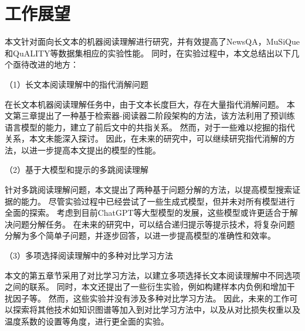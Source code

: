 \section{工作展望}
本文针对面向长文本的机器阅读理解进行研究，并有效提高了NewsQA，MuSiQue和QuALITY等数据集相应的实验性能。
同时，在实验过程中，本文总结出以下几个亟待改进的地方：

（1）长文本阅读理解中的指代消解问题

在长文本机器阅读理解任务中，由于文本长度巨大，存在大量指代消解问题。
本文第三章提出了一种基于检索器-阅读器二阶段架构的方法，该方法利用了预训练语言模型的能力，建立了前后文中的共指关系。
然而，对于一些难以挖掘的指代关系，本文未能深入探讨。
因此，在未来的研究中，可以继续研究指代消解的方法，以进一步提高本文提出的模型的性能。

（2）基于大模型和提示的多跳阅读理解

针对多跳阅读理解问题，本文提出了两种基于问题分解的方法，以提高模型搜索证据的能力。
尽管实验过程中已经尝试了一些生成式模型，但并未对所有模型进行全面的探索。
考虑到目前ChatGPT等大型模型的发展，这些模型或许更适合于解决问题分解任务。
在未来的研究中，可以结合递归提示等提示技术，将复杂问题分解为多个简单子问题，并逐步回答，以进一步提高模型的准确性和效率。

（3）多项选择阅读理解中的多种对比学习方法

本文的第五章节采用了对比学习方法，以建立多项选择长文本阅读理解中不同选项之间的联系。
同时，本文还提出了一些衍生实验，例如构建样本内负例和增加干扰因子等。
然而，这些实验并没有涉及多种对比学习方法。
因此，未来的工作可以探索将其他技术如知识图谱等加入到对比学习方法中，以及从对比损失权重以及温度系数的设置等角度，进行更全面的实验。

